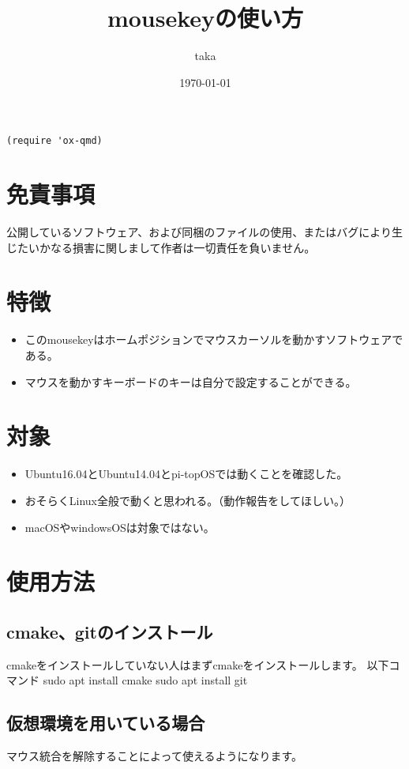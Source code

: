 \documentclass[11pt]{article}
\author{taka}
\date{\today}
\title{mousekeyの使い方}
\begin{document}
\maketitle
\tableofcontents

\begin{verbatim}
(require 'ox-qmd)
\end{verbatim}


\section{免責事項}
\label{sec:org8a2e981}
公開しているソフトウェア、および同梱のファイルの使用、またはバグにより生じたいかなる損害に関しまして作者は一切責任を負いません。

\section{特徴}
\label{sec:orgbee550a}
\begin{itemize}
\item このmousekeyはホームポジションでマウスカーソルを動かすソフトウェアである。
\item マウスを動かすキーボードのキーは自分で設定することができる。
\end{itemize}

\section{対象}
\label{sec:orgdda0362}
\begin{itemize}
\item Ubuntu16.04とUbuntu14.04とpi-topOSでは動くことを確認した。
\item おそらくLinux全般で動くと思われる。（動作報告をしてほしい。）
\item macOSやwindowsOSは対象ではない。
\end{itemize}

\section{使用方法}
\label{sec:org93dab86}
\subsection{cmake、gitのインストール}
\label{sec:orgedb5e14}
cmakeをインストールしていない人はまずcmakeをインストールします。
以下コマンド
sudo apt install cmake
sudo apt install git

\subsection{仮想環境を用いている場合}
\label{sec:org16d9054}
マウス統合を解除することによって使えるようになります。
\end{document}
